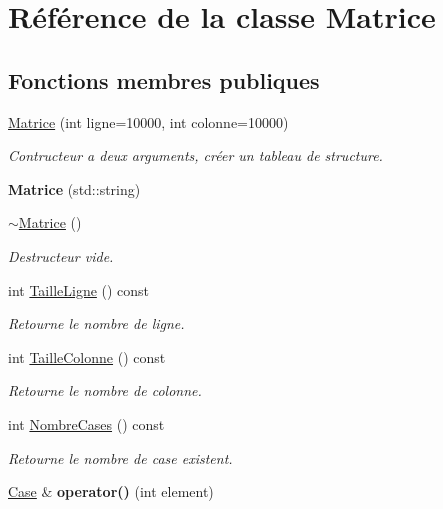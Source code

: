 \hypertarget{classMatrice}{\section{Référence de la classe Matrice}
\label{classMatrice}
}
\subsection*{Fonctions membres publiques}
\begin{DoxyCompactItemize}
\item 
\hyperlink{classMatrice_a381368ea1a5753a9864c31a1e1596a2e}{Matrice} (int ligne=10000, int colonne=10000)
\begin{DoxyCompactList}\small\item\em Contructeur a deux arguments, créer un tableau de structure. \end{DoxyCompactList}\item 
\hypertarget{classMatrice_a7a9d99db5f24a3b2c9b662d68b17e18c}{{\bfseries Matrice} (std\-::string)}\label{classMatrice_a7a9d99db5f24a3b2c9b662d68b17e18c}

\item 
\hypertarget{classMatrice_ae9076e71ad3223654b0d51225bc8b3c0}{\hyperlink{classMatrice_ae9076e71ad3223654b0d51225bc8b3c0}{$\sim$\-Matrice} ()}\label{classMatrice_ae9076e71ad3223654b0d51225bc8b3c0}

\begin{DoxyCompactList}\small\item\em Destructeur vide. \end{DoxyCompactList}\item 
int \hyperlink{classMatrice_a4aea33f47f5eaa578d529c39380c1202}{Taille\-Ligne} () const 
\begin{DoxyCompactList}\small\item\em Retourne le nombre de ligne. \end{DoxyCompactList}\item 
int \hyperlink{classMatrice_a145d6c61a681d0d7727a26304a598363}{Taille\-Colonne} () const 
\begin{DoxyCompactList}\small\item\em Retourne le nombre de colonne. \end{DoxyCompactList}\item 
int \hyperlink{classMatrice_afaec928a8d0d021441b243f80ca9fcfc}{Nombre\-Cases} () const 
\begin{DoxyCompactList}\small\item\em Retourne le nombre de case existent. \end{DoxyCompactList}\item 
\hypertarget{classMatrice_a9296005ce933f25059fc65b88261bbef}{\hyperlink{structCase}{Case} \& {\bfseries operator()} (int element)}\label{classMatrice_a9296005ce933f25059fc65b88261bbef}


\end{DoxyCompactItemize}

